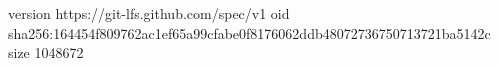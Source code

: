 version https://git-lfs.github.com/spec/v1
oid sha256:164454f809762ac1ef65a99cfabe0f8176062ddb48072736750713721ba5142c
size 1048672
